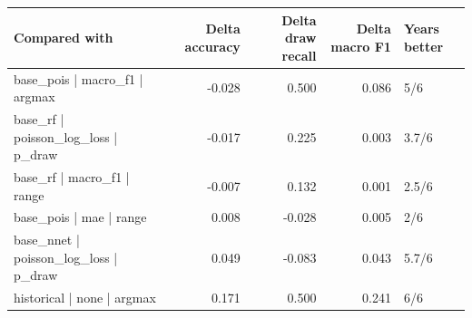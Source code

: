 
\begin{tabular}{lrrrl}
\toprule
Compared with & Delta accuracy & Delta draw recall & Delta macro F1 & Years better\\
\midrule
base\_pois | macro\_f1 | argmax & -0.028 & 0.500 & 0.086 & 5/6\\
base\_rf | poisson\_log\_loss | p\_draw & -0.017 & 0.225 & 0.003 & 3.7/6\\
base\_rf | macro\_f1 | range & -0.007 & 0.132 & 0.001 & 2.5/6\\
base\_pois | mae | range & 0.008 & -0.028 & 0.005 & 2/6\\
base\_nnet | poisson\_log\_loss | p\_draw & 0.049 & -0.083 & 0.043 & 5.7/6\\
historical | none | argmax & 0.171 & 0.500 & 0.241 & 6/6\\
\bottomrule
\end{tabular}

